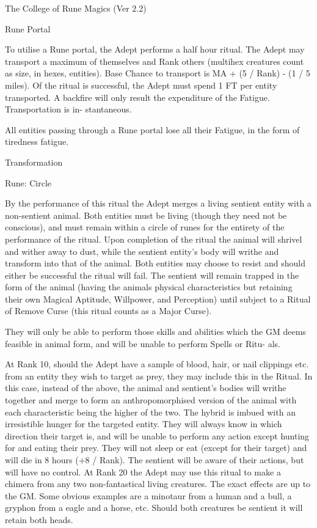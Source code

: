 \begin{Chapter}{The College of Rune Magics (Ver 2.2)}
\begin{ritual}[R-6]{Rune Portal }
\begin{effects}
To utilise a Rune portal, the Adept performs a half 
hour  ritual.  The  Adept  may  transport  a  maximum 
of themselves and Rank others (multihex creatures 
count  as  size,  in  hexes,  entities).  Base  Chance  to 
transport is MA + (5 / Rank) - (1 / 5 miles). Of the 
ritual is successful, the Adept must spend 1 FT per 
entity  transported.  A  backfire  will  only  result  the 
expenditure  of  the  Fatigue.  Transportation  is  in-
stantaneous. 

All  entities  passing  through  a  Rune  portal  lose  all 
their Fatigue, in the form of tiredness fatigue. 
\end{effects}
\end{ritual}

\begin{ritual}[R-7]{Transformation }

Rune: Circle 
\begin{effects}
By the performance of this ritual the Adept merges a living sentient
entity with a non-sentient animal.  Both entities must be living
(though they need not be conscious), and must remain within a circle
of runes for the entirety of the performance of the ritual.  Upon
completion of the ritual the animal will shrivel and wither away to
dust, while the sentient entity’s body will writhe and transform into
that of the animal. Both entities may choose to resist and should
either be successful the ritual will fail. The sentient will remain
trapped in the form of the animal (having the animals physical
characteristics but retaining their own Magical Aptitude, Willpower,
and Perception) until subject to a Ritual of Remove Curse (this ritual
counts as a Major Curse).

They will only be able to perform those skills and abilities which the
GM deems feasible in animal form, and will be unable to perform Spells
or Ritu- als.

At Rank 10, should the Adept have a sample of blood, hair, or nail
clippings etc.  from an entity they wish to target as prey, they may
include this in the Ritual.  In this case, instead of the above, the
animal and sentient’s bodies will writhe together and merge to form an
anthropomorphised version of the animal with each characteristic being
the higher of the two.  The hybrid is imbued with an irresistible
hunger for the targeted entity. They will always know in which
direction their target is, and will be unable to perform any action
except hunting for and eating their prey. They will not sleep or eat
(except for their target) and will die in 8 hours (+8 / Rank).  The
sentient will be aware of their actions, but will have no control.  At
Rank 20 the Adept may use this ritual to make a chimera from any two
non-fantastical living creatures. The exact effects are up to the GM.
Some obvious examples are a minotaur from a human and a bull, a
gryphon from a eagle and a horse, etc.  Should both creatures be
sentient it will retain both heads.
\end{effects}
\end{ritual}

\end{Chapter}
